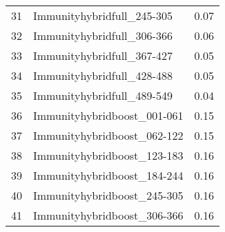 \begin{table}[ht]
\begin{tabular}{rlr}
  31 & Immunityhybridfull\_245-305 & 0.07 \\ 
  32 & Immunityhybridfull\_306-366 & 0.06 \\ 
  33 & Immunityhybridfull\_367-427 & 0.05 \\ 
  34 & Immunityhybridfull\_428-488 & 0.05 \\ 
  35 & Immunityhybridfull\_489-549 & 0.04 \\ 
  36 & Immunityhybridboost\_001-061 & 0.15 \\ 
  37 & Immunityhybridboost\_062-122 & 0.15 \\ 
  38 & Immunityhybridboost\_123-183 & 0.16 \\ 
  39 & Immunityhybridboost\_184-244 & 0.16 \\ 
  40 & Immunityhybridboost\_245-305 & 0.16 \\ 
  41 & Immunityhybridboost\_306-366 & 0.16 \\ 
   \hline
\end{tabular}
\end{table}
